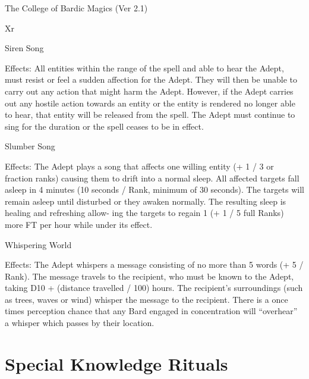 \begin{Chapter}{The College of Bardic Magics (Ver 2.1)}
\begin{tarularx}{\columnwidth}{Xr}
\begin{spell}[S-12]{Siren Song }

Effects:  All  entities  within  the  range  of  the  spell 
and  able  to  hear  the  Adept,  must  resist  or  feel  a 
sudden  affection  for  the  Adept.  They  will  then  be 
unable to carry out any action that might harm the 
Adept. However, if the  Adept carries out any hostile  action  towards  an  entity  or  the  entity  is  rendered  no  longer  able  to  hear,  that  entity  will  be 
released  from  the  spell.  The  Adept  must  continue 
to sing for the duration or the spell ceases to be in 
effect. 
\end{spell}

\begin{spell}[S-13]{Slumber Song }

Effects:  The  Adept  plays  a  song  that  affects  one 
willing  entity  (+  1  /  3  or  fraction  ranks)  causing 
them to  drift into  a  normal  sleep.  All  affected  targets  fall  asleep  in  4  minutes  (10  seconds  /  Rank, 
minimum  of  30  seconds).  The  targets  will  remain 
asleep  until  disturbed  or  they  awaken  normally. 
The resulting sleep is healing and refreshing allow-
ing the targets to regain 1 (+ 1 / 5 full Ranks) more 
FT per hour while under its effect. 
\end{spell}

\begin{spell}[S-14]{Whispering World }

Effects:  The  Adept  whispers  a  message  consisting 
of no more than 5 words (+ 5 / Rank). The message 
travels to the recipient, who must be known to the 
Adept,  taking  D10  +  (distance  travelled  /  100) 
hours.  The  recipient’s  surroundings  (such  as trees, 
waves or  wind) whisper the message to the recipient.  There  is  a  once  times  perception  chance  that 
any Bard engaged in concentration will “overhear” 
a whisper which passes by their location. 
\end{spell}

\section{Special Knowledge Rituals}


\end{tarularx}
\end{Chapter}
